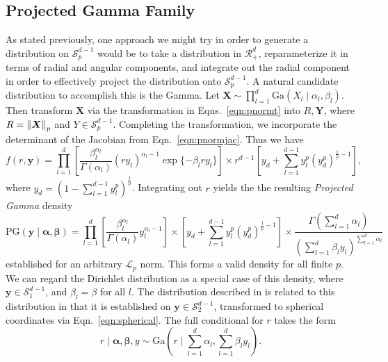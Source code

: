 \subsection{Projected Gamma Family}
As stated previously, one approach we might try in order to generate a distribution on
  $\mathcal{S}_{p}^{d-1}$ would be to take a distribution in $\mathcal{R}_{+}^d$, reparameterize
  it in terms of radial and angular components, and integrate out the radial component in order to
  effectively project the distribution onto $\mathcal{S}_{p}^{d-1}$.  A natural candidate distribution
  to accomplish this is the Gamma.  Let $\bm{ X} \sim \prod_{l = 1}^d\text{Ga}\left(X_l\mid\alpha_l,\beta_l\right)$.
  Then transform $\bm{ X}$ via the transformation in Eqns.~\ref{eqn:pnormt} into $R,\bm{ Y}$, where
  $R = \left\lVert \bm{ X} \right\rVert_{p}$ and $Y\in \mathcal{S}_{p}^{d-1}$.  Completing the transformation, we
  incorporate the determinant of the Jacobian from Eqn.~\ref{eqn:pnormjac}.  Thus we have
  \begin{equation}
    \label{eqn:protopg}
    f(r,\bm{ y}) = \prod_{l = 1}^{d}
      \left[\frac{\beta_l^{\alpha_l}}{\Gamma(\alpha_l)}(ry_l)^{\alpha_l - 1}\exp\lbrace-\beta_lry_l\rbrace\right]
      \times r^{d-1}\left[y_d + {\textstyle \sum}_{l = 1}^{d-1}y_l^p\left(y_d^p\right)^{\frac{1}{p} - 1}\right],
  \end{equation}
  where $y_d = \left(1 - \sum_{l=1}^{d-1}y_l^p\right)^{\frac{1}{p}}$. Integrating out $r$ yields the
  the resulting \emph{Projected Gamma} density
  \begin{equation}
    \label{eqn:projgamma}
    \text{PG}(\bm{ y}\mid\bm{ \alpha},\bm{ \beta}) = \prod_{l = 1}^d\left[\frac{\beta_l^{\alpha_l}}{\Gamma(\alpha_l)}y_l^{\alpha_l - 1}\right]
      \times \left[y_d + {\textstyle \sum}_{l = 1}^{d-1}y_l^p\left(y_d^p\right)^{\frac{1}{p} - 1}\right]
      \times \frac{\Gamma({\textstyle\sum}_{l = 1}^d\alpha_l)}{\left({\textstyle\sum}_{l = 1}^d \beta_ly_l\right)^{{\textstyle\sum_{l = 1}^d \alpha_l}}}
  \end{equation}
  established for an arbitrary $\mathcal{L}_p$ norm. This forms a valid density for all finite $p$.
  We can regard the Dirichlet distribution as a special case of this density, where
  $\bm{ y}\in \mathcal{S}_1^{d-1}$, and $\beta_l = \beta$ for all $l$.  The distribution described
  in \cite{nunez2019} is related to this distribution in that it is established on
  $\bm{ y}\in \mathcal{S}_2^{d-1}$, transformed to spherical coordinates via Eqn.~\ref{eqn:spherical}.
  The full conditional for $r$ takes the form
  \begin{equation}
    \label{eqn:rfullcond}
    r\mid\bm{ \alpha},\bm{ \beta}, y \sim \text{Ga}\left(r\mid\sum_{l = 1}^d \alpha_l, \sum_{l = 1}^d \beta_ly_l\right).
  \end{equation}

